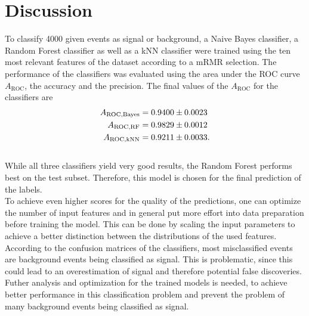 \section{Discussion}
\label{sec:Discussion}

To classify 4000 given events as signal or background, a Naive Bayes classifier, a Random Forest classifier as well as a kNN classifier were 
trained using the ten most relevant features of the dataset according to a mRMR selection. The performance of the classifiers was evaluated using
the area under the ROC curve $A_{\mathrm{ROC}}$, the accuracy and the precision. The final values of the $A_{\mathrm{ROC}}$ for the classifiers are
\begin{align*}
    A_{\mathrm{ROC, Bayes}} &= \num{0.9400+-0.0023} \\
    A_{\mathrm{ROC, RF}} &= \num{0.9829(0.0012)} \\
    A_{\mathrm{ROC, kNN}} &= \num{0.9211 \pm 0.0033}.
\end{align*}
\\While all three classifiers yield very good results, the Random Forest performs best on the test subset. Therefore, this model is chosen for the 
final prediction of the labels.\\
To achieve even higher scores for the quality of the predictions, one can optimize the number of input features and in general put more
effort into data preparation before training the model. This can be done by scaling the input parameters to achieve a better distinction 
between the distributions of the used features.\\
According to the confusion matrices of the classifiers, most misclassified events are background events being classified as signal. This is
problematic, since this could lead to an overestimation of signal and therefore potential false discoveries.\\
Futher analysis and optimization for the trained models is needed, to achieve better performance in this classification problem and prevent
the problem of many background events being classified as signal.

